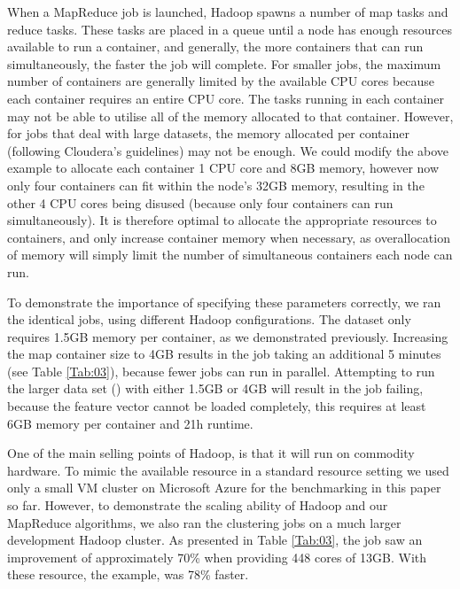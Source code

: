 \documentclass{bioinfo}
\begin{document}
When a MapReduce job is launched, Hadoop spawns a number of map tasks and reduce tasks. 
These tasks are placed in a queue until a node has enough resources available to run a container, and generally, the more containers that can run simultaneously, the faster the job will complete.
For smaller jobs, the maximum number of containers are generally limited by the available CPU cores because each container requires an entire CPU core. The tasks running in each container may not be able to utilise all of the memory allocated to that container.
However, for jobs that deal with large datasets, the memory allocated per container (following Cloudera's guidelines) may not be enough.
We could modify the above example to allocate each container 1 CPU core and 8GB memory, however now only four containers can fit within the node's 32GB memory, resulting in the other 4 CPU cores being disused (because only four containers can run simultaneously). It is therefore optimal to
allocate the appropriate resources to containers, and only increase container memory when necessary, as overallocation of memory will simply limit the number of simultaneous containers each node can run.

To demonstrate the importance of specifying these parameters correctly, we ran the identical jobs, using different Hadoop configurations. 
The \OnePhaseone{} dataset only requires 1.5GB memory per container, as we demonstrated previously.
Increasing the map container size to 4GB results in the job taking an additional 5 minutes (see Table \ref{Tab:03}), because fewer jobs can run in parallel. 
Attempting to run the larger data set (\FullPhasethree{}) with either 1.5GB or 4GB will result in the job failing, because the feature vector cannot be loaded completely, this requires at least 6GB memory per container and 21h runtime. 

One of the main selling points of Hadoop, is that it will run on commodity hardware. 
To mimic the available resource in a standard resource setting we used only a small VM cluster on Microsoft Azure for the benchmarking in this paper so far.
However, to demonstrate the scaling ability of Hadoop and our MapReduce algorithms, we also ran the clustering jobs on a much larger development Hadoop cluster. 
As presented in Table \ref{Tab:03}, the \OnePhaseone{} job saw an improvement of approximately 70\% when providing 448 cores of 13GB. 
With these resource, the \FullPhasethree{} example, was 78\% faster.
\end{document}
